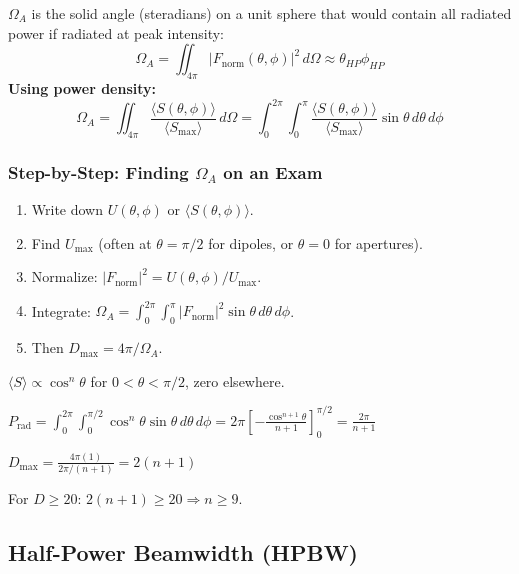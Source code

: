 \documentclass[10pt,letterpaper]{article}
\begin{document}
\begin{tcolorbox}[formulabox, title={Beam Solid Angle $\Omega_A$}]
$\Omega_A$ is the solid angle (steradians) on a unit sphere that would contain all radiated power if radiated at peak intensity:
\begin{equation}
  \Omega_A = \iint_{4\pi} |F_\mathrm{norm}(\theta,\phi)|^2\,d\Omega \approx \theta_{HP}\phi_{HP}
\end{equation}
\textbf{Using power density:}
\begin{equation}
  \Omega_A = \iint_{4\pi}\frac{\langle S(\theta,\phi)\rangle}{\langle S_\mathrm{max}\rangle}\,d\Omega = \int_0^{2\pi}\!\int_0^{\pi}\frac{\langle S(\theta,\phi)\rangle}{\langle S_\mathrm{max}\rangle}\sin\theta\,d\theta\,d\phi
\end{equation}
\end{tcolorbox}

\subsubsection{Step-by-Step: Finding $\Omega_A$ on an Exam}
\begin{enumerate}[noitemsep]
  \item Write down $U(\theta,\phi)$ or $\langle S(\theta,\phi)\rangle$.
  \item Find $U_\mathrm{max}$ (often at $\theta=\pi/2$ for dipoles, or $\theta=0$ for apertures).
  \item Normalize: $|F_\mathrm{norm}|^2 = U(\theta,\phi)/U_\mathrm{max}$.
  \item Integrate: $\Omega_A = \int_0^{2\pi}\int_0^{\pi}|F_\mathrm{norm}|^2\sin\theta\,d\theta\,d\phi$.
  \item Then $D_\mathrm{max} = 4\pi/\Omega_A$.
\end{enumerate}

\begin{tcolorbox}[examplebox, title={HW1 P2 Example: Cosine Power Pattern}]
$\langle S\rangle \propto \cos^n\theta$ for $0<\theta<\pi/2$, zero elsewhere.

$P_\mathrm{rad} = \int_0^{2\pi}\int_0^{\pi/2}\cos^n\theta\sin\theta\,d\theta\,d\phi = 2\pi\left[-\frac{\cos^{n+1}\theta}{n+1}\right]_0^{\pi/2} = \frac{2\pi}{n+1}$

$D_\mathrm{max} = \frac{4\pi(1)}{2\pi/(n+1)} = 2(n+1)$

For $D\geq 20$: $2(n+1)\geq 20 \Rightarrow n\geq 9$.
\end{tcolorbox}

\subsection{Half-Power Beamwidth (HPBW)}
\end{document}
